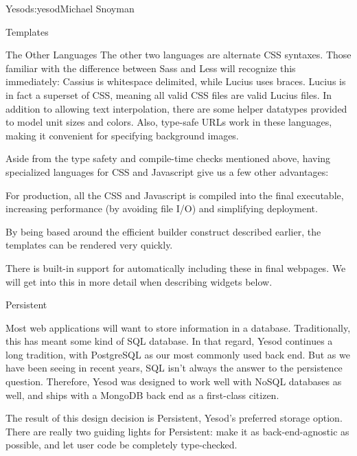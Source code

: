 \begin{aosachapter}{Yesod}{s:yesod}{Michael Snoyman}
\begin{aosasect1}{Templates}
\begin{aosasect2}{The Other Languages}
The other two languages are alternate CSS syntaxes. Those familiar
with the difference between Sass and Less will recognize this
immediately: Cassius is whitespace delimited, while Lucius uses
braces. Lucius is in fact a superset of CSS, meaning all valid CSS
files are valid Lucius files. In addition to allowing text
interpolation, there are some helper datatypes provided to model unit
sizes and colors. Also, type-safe URLs work in these languages, making
it convenient for specifying background images.

Aside from the type safety and compile-time checks mentioned above,
having specialized languages for CSS and Javascript give us a few
other advantages:

\begin{aosaitemize}

\item For production, all the CSS and Javascript is compiled into the
  final executable, increasing performance (by avoiding file I/O) and
  simplifying deployment.

\item By being based around the efficient builder construct described
  earlier, the templates can be rendered very quickly.

\item There is built-in support for automatically including these in
  final webpages. We will get into this in more detail when describing
  widgets below.

\end{aosaitemize}

\end{aosasect2}

\end{aosasect1}

\begin{aosasect1}{Persistent}

Most web applications will want to store information in a
database. Traditionally, this has meant some kind of SQL database. In
that regard, Yesod continues a long tradition, with PostgreSQL as our
most commonly used back end. But as we have been seeing in recent
years, SQL isn't always the answer to the persistence
question. Therefore, Yesod was designed to work well with NoSQL
databases as well, and ships with a MongoDB back end as a first-class
citizen.

The result of this design decision is Persistent, Yesod's preferred
storage option. There are really two guiding lights for Persistent:
make it as back-end-agnostic as possible, and let user code be
completely type-checked.


\end{aosasect1}
\end{aosachapter}
